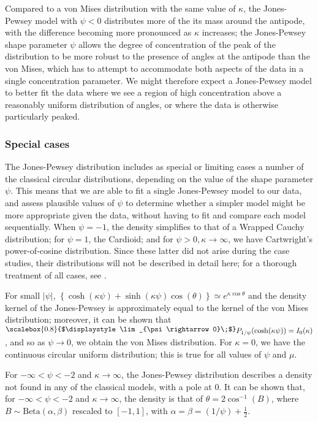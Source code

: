\documentclass[../../ArchStats.tex]{subfiles}
\newcommand{\Lim}[1]{\raisebox{0.5ex}{\scalebox{0.8}{$\displaystyle \lim_{#1}\;$}}}
\begin{document}
Compared to a von Mises distribution with the same value of $\kappa$, the Jones-Pewsey model with $\psi < 0$ distributes more of the its mass around the antipode, with the difference becoming more pronounced as $\kappa$ increases; the Jones-Pewsey shape parameter $\psi$ allows the degree of concentration of the peak of the distribution to be more robust to the presence of angles at the antipode than the von Mises, which has to attempt to accommodate both aspects of the data in a single concentration parameter. We might therefore expect a Jones-Pewsey model to better fit the data where we see a region of high concentration above a reasonably uniform distribution of angles, or where the data is otherwise particularly peaked.

\subsubsection{Special cases}

The Jones-Pewsey distribution includes as special or limiting cases a number of the classical circular distributions, depending on the value of the shape parameter $\psi$. This means that we are able to fit a single Jones-Pewsey model to our data, and assess plausible values of $\psi$ to determine whether a simpler model might be more appropriate given the data, without having to fit and compare each model sequentially. When $\psi = -1$, the density simplifies to that of a Wrapped Cauchy distribution; for $\psi = 1$, the Cardioid; and for $\psi > 0, \kappa \rightarrow \infty$, we have Cartwright's power-of-cosine distribution. Since these latter did not arise during the case studies, their distributions will  not be described in detail here; for a thorough treatment of all cases, see \cite{Jones2005}. 

For small $\vert \psi \vert$, $\left\lbrace \cosh(\kappa\psi) + \sinh(\kappa\psi) \cos(\theta) \right\rbrace \simeq e^{\kappa \cos \theta}$ and the density kernel of the Jones-Pewsey is approximately equal to the kernel of the von Mises distribution; moreover, it can be shown that $\Lim{\psi \rightarrow 0} P_{1/\psi}(\cosh(\kappa\psi)) = I_0(\kappa)$, and so as $\psi \rightarrow 0$, we obtain the von Mises distribution. For $\kappa = 0$, we have the continuous circular uniform distribution; this is true for all values of $\psi$ and $\mu$.

For $-\infty < \psi < -2$ and $\kappa \rightarrow \infty$, the Jones-Pewsey distribution describes a density not found in any of the classical models, with a pole at 0. It can be shown that, for $-\infty < \psi < -2$ and $\kappa \rightarrow \infty$, the density is that of $\theta = 2 \cos^{-1}(B)$, where $B \sim \text{Beta}(\alpha, \beta)$ rescaled to  $[-1,1]$, with $\alpha = \beta = (1/\psi) + \frac{1}{2}$.
\end{document}

